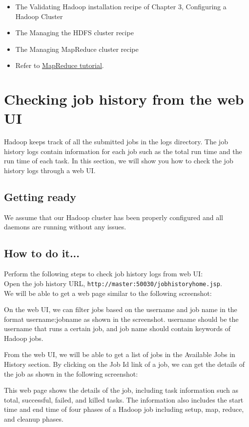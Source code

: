 \begin{itemize}
  \item The Validating Hadoop installation recipe of Chapter 3, Configuring a Hadoop Cluster
  \item The Managing the HDFS cluster recipe
  \item The Managing MapReduce cluster recipe
  \item Refer to \href{http://hadoop.apache.org/docs/r1.1.2/mapred_tutorial.html}{MapReduce tutorial}.
\end{itemize}

\section{Checking job history from the web UI}
Hadoop keeps track of all the submitted jobs in the logs directory. The job history logs contain information for each job such as the total run time and the run time of each task. In this section, we will show you how to check the job history logs through a web UI.
\subsection*{Getting ready}
We assume that our Hadoop cluster has been properly configured and all daemons are running without any issues.
\subsection*{How to do it...}
Perform the following steps to check job history logs from web UI:\\ 

Open the job history URL, \verb|http://master:50030/jobhistoryhome.jsp|. \\
We will be able to get a web page similar to the following screenshot:

On the web UI, we can filter jobs based on the username and job name in the format username:jobname as shown in the screenshot. username should be the username that runs a certain job, and job name should contain keywords of Hadoop jobs.

From the web UI, we will be able to get a list of jobs in the Available Jobs in History section. By clicking on the Job Id link of a job, we can get the details of the job as shown in the following screenshot:

This web page shows the details of the job, including task information such as total, successful, failed, and killed tasks. The information also includes the start time and end time of four phases of a Hadoop job including setup, map, reduce, and cleanup phases.

